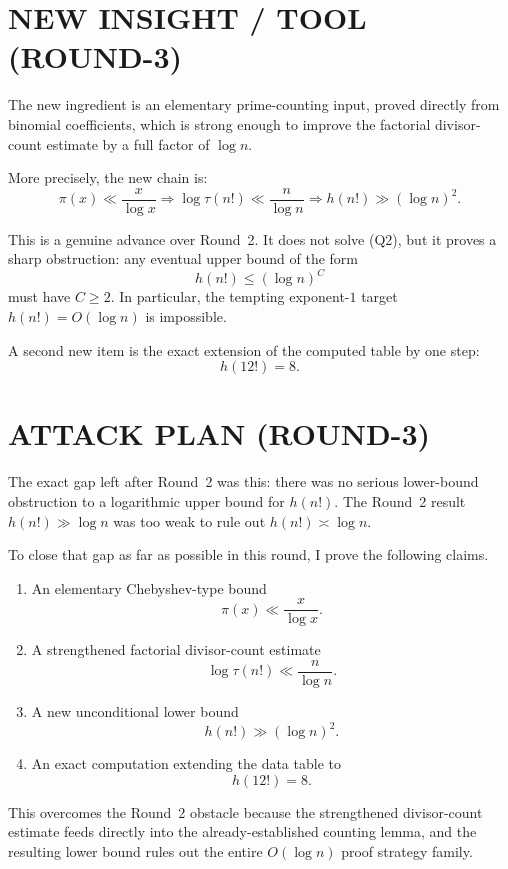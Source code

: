 \section{NEW INSIGHT / TOOL (ROUND-3)}

The new ingredient is an elementary prime-counting input, proved directly from binomial coefficients, which is strong enough to improve the factorial divisor-count estimate by a full factor of \(\log n\).

More precisely, the new chain is:
\[
\pi(x) \ll \frac{x}{\log x}
\Longrightarrow
\log\tau(n!) \ll \frac{n}{\log n}
\Longrightarrow
h(n!) \gg (\log n)^2.
\]

This is a genuine advance over Round~2. It does not solve (Q2), but it proves a sharp obstruction: any eventual upper bound of the form
\[
h(n!)\le (\log n)^C
\]
must have \(C\ge 2\). In particular, the tempting exponent-\(1\) target \(h(n!)=O(\log n)\) is impossible.

A second new item is the exact extension of the computed table by one step:
\[
h(12!)=8.
\]

\section{ATTACK PLAN (ROUND-3)}

The exact gap left after Round~2 was this: there was no serious lower-bound obstruction to a logarithmic upper bound for \(h(n!)\). The Round~2 result \(h(n!)\gg \log n\) was too weak to rule out \(h(n!)\asymp \log n\).

To close that gap as far as possible in this round, I prove the following claims.

\begin{enumerate}
\item An elementary Chebyshev-type bound
\[
\pi(x) \ll \frac{x}{\log x}.
\]
\item A strengthened factorial divisor-count estimate
\[
\log\tau(n!) \ll \frac{n}{\log n}.
\]
\item A new unconditional lower bound
\[
h(n!) \gg (\log n)^2.
\]
\item An exact computation extending the data table to
\[
h(12!)=8.
\]
\end{enumerate}

This overcomes the Round~2 obstacle because the strengthened divisor-count estimate feeds directly into the already-established counting lemma, and the resulting lower bound rules out the entire \(O(\log n)\) proof strategy family.

